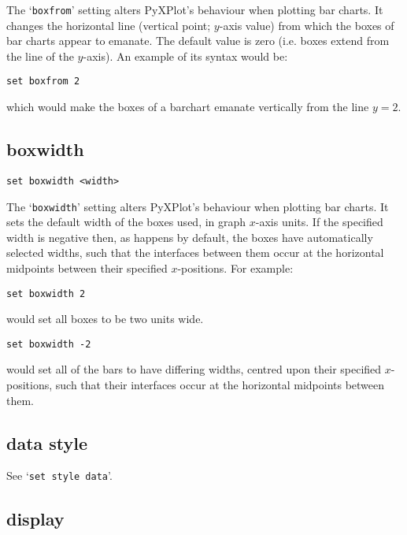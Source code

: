 \documentclass[a4paper,onecolumn,11pt]{book}
\begin{document}
The `{\tt boxfrom}' setting alters PyXPlot's behaviour when plotting bar charts.
It changes the horizontal line (vertical point; $y$-axis value) from which the
boxes of bar charts appear to emanate.  The default value is zero (i.e. boxes
extend from the line of the $y$-axis). An example of its syntax would be:

\begin{verbatim}
set boxfrom 2
\end{verbatim}

\noindent which would make the boxes of a barchart emanate vertically from the line $y=2$.


\subsection{boxwidth}

\begin{verbatim}
set boxwidth <width>
\end{verbatim}

The `{\tt boxwidth}' setting alters PyXPlot's behaviour when plotting bar charts.
It sets the default width of the boxes used, in graph $x$-axis units.  If the
specified width is negative then, as happens by default, the boxes have
automatically selected widths, such that the interfaces between them occur at
the horizontal midpoints between their specified $x$-positions.  For example:

\begin{verbatim}
set boxwidth 2
\end{verbatim}

\noindent would set all boxes to be two units wide.

\begin{verbatim}
set boxwidth -2
\end{verbatim}

\noindent would set all of the bars to have differing widths, centred upon their
specified $x$-positions, such that their interfaces occur at the horizontal
midpoints between them.


\subsection{data style}

See `{\tt set style data}'.

\subsection{display}
\end{document}
